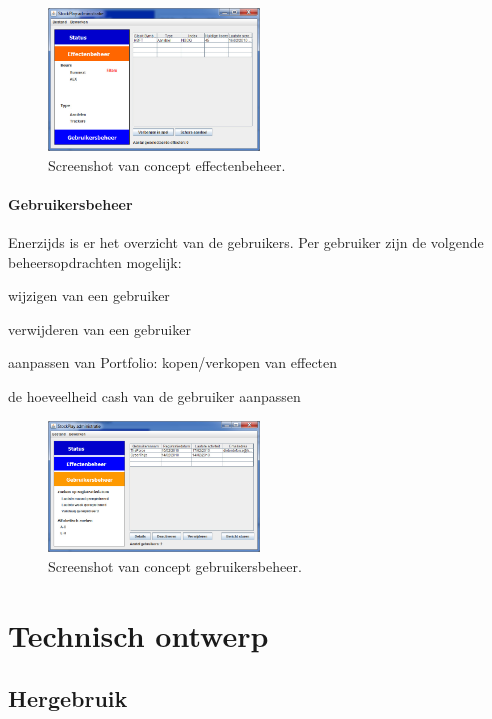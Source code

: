 \begin{figure}[h!]
	\centering
		\includegraphics[width=0.5\textwidth]{images/ontwerp/screenshot_app_effecten}
	\caption{Screenshot van concept effectenbeheer.}
\end{figure}

\paragraph{Gebruikersbeheer}Enerzijds is er het overzicht van de gebruikers. Per gebruiker zijn de volgende beheersopdrachten mogelijk: 
\begin{itemize_compact}
	\item{wijzigen van een gebruiker}
	\item{verwijderen van een gebruiker}
	\item{aanpassen van Portfolio: kopen/verkopen van effecten}
	\item{de hoeveelheid cash van de gebruiker aanpassen}
\end{itemize_compact}

\begin{figure}[h!]
	\centering
		\includegraphics[width=0.5\textwidth]{images/ontwerp/screenshot_app_gebruikers}
	\caption{Screenshot van concept gebruikersbeheer.}
\end{figure}


%
%

\section{Technisch ontwerp}

\subsection{Hergebruik}

